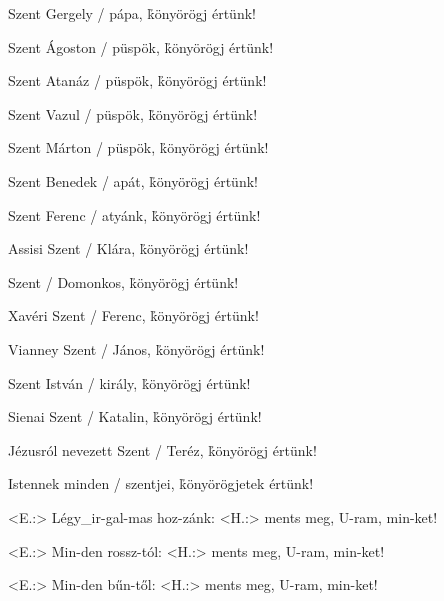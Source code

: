 \documentclass[twoside]{article}
\begin{document}
\e Szent Gergely / pápa,                              \hfill\h könyörögj értünk!

\e Szent Ágoston / püspök,                            \hfill\h könyörögj értünk!

\e Szent Atanáz / püspök,                             \hfill\h könyörögj értünk!

\e Szent Vazul / püspök,                              \hfill\h könyörögj értünk!

\e Szent Márton / püspök,                             \hfill\h könyörögj értünk!

\e Szent Benedek / apát,                              \hfill\h könyörögj értünk!

\e Szent Ferenc / atyánk,                             \hfill\h könyörögj értünk!

\e Assisi Szent / Klára,                              \hfill\h könyörögj értünk!

\e Szent / Domonkos,                                  \hfill\h könyörögj értünk!

\e Xavéri Szent / Ferenc,                             \hfill\h könyörögj értünk!

\e Vianney Szent / János,                             \hfill\h könyörögj értünk!

\e Szent István / király,                             \hfill\h könyörögj értünk!

\e Sienai Szent / Katalin,                            \hfill\h könyörögj értünk!

\e Jézusról nevezett Szent / Teréz,                   \hfill\h könyörögj értünk!

\e Istennek minden / szentjei,                        \hfill\h könyörögjetek értünk!

\begin{gregosheet}
            {   <E.:> Légy_ir-gal-mas hoz-zánk: <H.:> ments meg, U-ram, min-ket!}
\end{gregosheet}

\begin{gregosheet}
            {   <E.:> Min-den rossz-tól: <H.:> ments meg, U-ram, min-ket!}
\end{gregosheet}

\begin{gregosheet}
            {   <E.:> Min-den bűn-től: <H.:> ments meg, U-ram, min-ket!}
\end{gregosheet}
\end{document}
